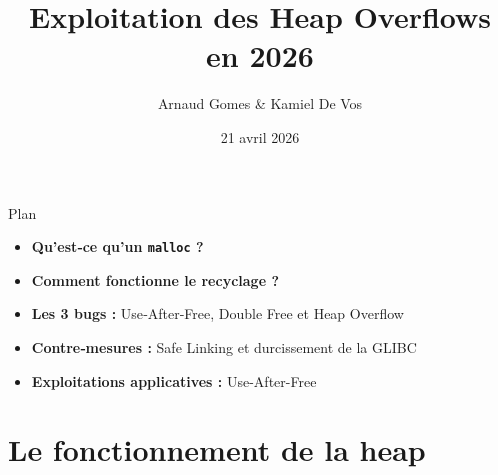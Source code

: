 \documentclass[10pt]{beamer}
\title{Exploitation des Heap Overflows en 2026}
\author{Arnaud Gomes \& Kamiel De Vos}
\institute{Université de Bordeaux}
\date{21 avril 2026}
\begin{document}
\begin{frame}[plain]
    \titlepage
\end{frame}


\begin{frame}{Plan}

    \begin{itemize}
        \item \textbf{Qu'est‑ce qu'un \texttt{malloc} ?}
        \item \textbf{Comment fonctionne le recyclage ?}
        \item \textbf{Les 3 bugs :} Use‑After‑Free, Double Free et Heap Overflow
        \item \textbf{Contre‑mesures :} Safe Linking et durcissement de la GLIBC
        \item \textbf{Exploitations applicatives :} Use-After-Free
    \end{itemize}

\end{frame}

\section{Le fonctionnement de la heap}
\end{document}

